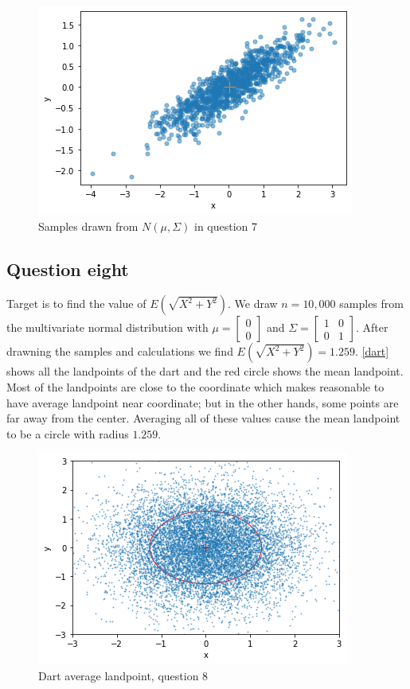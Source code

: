 \documentclass[12pt, a4paper]{book}
\begin{document}
\begin{figure}[h]
    \centering
    \includegraphics*[width=0.7\linewidth]{images/question7/distribution.png}
    \caption{Samples drawn from $N(\mu, \Sigma)$ in question 7}
\end{figure}

\clearpage

\subsection*{Question eight}

Target is to find the value of $E(\sqrt{X^2+Y^2})$. We draw $n=10,000$ samples from the multivariate
normal distribution with $\mu=\begin{bmatrix}0\\0\end{bmatrix}$ and $\Sigma=\begin{bmatrix}1&0\\0&1\end{bmatrix}$.
After drawning the samples and calculations we find $E(\sqrt{X^2+Y^2})=1.259$. \autoref{dart} shows all the
landpoints of the dart and the red circle shows the mean landpoint. Most of the landpoints are close to the
coordinate which makes reasonable to have average landpoint near coordinate; but in the other hands,
some points are far away from the center. Averaging all of these values cause the mean landpoint to be a circle
with radius $1.259$.

\vspace*{1cm}

\begin{figure}[h]
    \centering
    \includegraphics*[width=0.6\linewidth]{images/question8/output.png}
    \caption{Dart average landpoint, question 8}
    \label{dart}
\end{figure}
\end{document}
